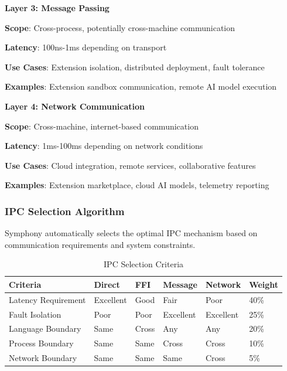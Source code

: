 \textbf{Layer 3: Message Passing}
\begin{compactlist}
    \item \textbf{Scope}: Cross-process, potentially cross-machine communication
    \item \textbf{Latency}: 100ns-1ms depending on transport
    \item \textbf{Use Cases}: Extension isolation, distributed deployment, fault tolerance
    \item \textbf{Examples}: Extension sandbox communication, remote AI model execution
\end{compactlist}

\textbf{Layer 4: Network Communication}
\begin{compactlist}
    \item \textbf{Scope}: Cross-machine, internet-based communication
    \item \textbf{Latency}: 1ms-100ms depending on network conditions
    \item \textbf{Use Cases}: Cloud integration, remote services, collaborative features
    \item \textbf{Examples}: Extension marketplace, cloud AI models, telemetry reporting
\end{compactlist}

\subsubsection*{IPC Selection Algorithm}

Symphony automatically selects the optimal IPC mechanism based on communication requirements and system constraints.

\begin{table}[h]
\centering
\caption{IPC Selection Criteria}
\label{tab:ipc-selection}
\begin{tabular}{@{}llllll@{}}
\toprule
\textbf{Criteria} & \textbf{Direct} & \textbf{FFI} & \textbf{Message} & \textbf{Network} & \textbf{Weight} \\
\midrule
Latency Requirement & Excellent & Good & Fair & Poor & 40\% \\
Fault Isolation & Poor & Poor & Excellent & Excellent & 25\% \\
Language Boundary & Same & Cross & Any & Any & 20\% \\
Process Boundary & Same & Same & Cross & Cross & 10\% \\
Network Boundary & Same & Same & Same & Cross & 5\% \\
\bottomrule
\end{tabular}
\end{table}

